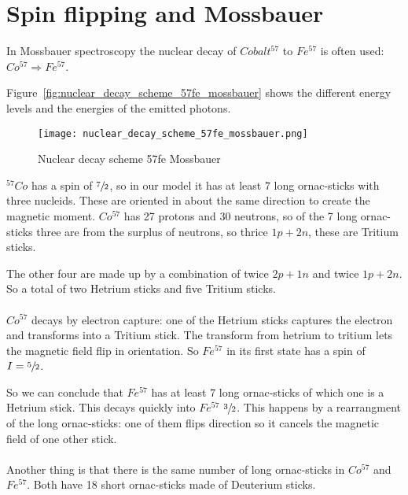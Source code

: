 \section{Spin flipping and Mossbauer}

In Mossbauer spectroscopy the nuclear decay of $Cobalt^{57}$ to $Fe^{57}$ is often used: $Co^{57} \Rightarrow Fe^{57}$.

Figure~\vref{fig:nuclear_decay_scheme_57fe_mossbauer} shows the different energy levels and the energies of the emitted photons.


\begin{figure}[!ht]
    \texttt{[image: nuclear\_decay\_scheme\_57fe\_mossbauer.png]}
    \caption{Nuclear decay scheme 57fe Mossbauer\label{fig:nuclear_decay_scheme_57fe_mossbauer}}
    
\end{figure}

$^{57}Co$ has a spin of $\sfrac{7}{2}$, so in our model it has at least 7 long ornac-sticks with three nucleids. These are oriented in about the same direction to create the magnetic moment.
$Co^{57}$ has 27 protons and 30 neutrons, so of the 7  long ornac-sticks three are from the surplus of neutrons, so thrice $1p+2n$, these are Tritium sticks. 

The other four are made up by a combination of twice $2p+1n$ and twice $1p+2n$. So a total of two Hetrium sticks and five Tritium sticks.

\paragraph{}
$Co^{57}$  decays by electron capture: one of the Hetrium sticks captures the electron and transforms into a Tritium stick. The transform from hetrium to tritium lets the magnetic field flip in orientation. So $Fe^{57}$ in its first state has a spin of $I = \sfrac{5}{2}$.

So we can conclude that $Fe^{57}$ has at least 7 long ornac-sticks of which one is a Hetrium stick.
This decays quickly into $Fe^{57}$ $\sfrac{3}{2}$. This happens by a rearrangment of the long ornac-sticks: one of them flips direction so it cancels the magnetic field of one other stick.

\paragraph{}
Another thing is that there is the same number of long ornac-sticks in $Co^{57}$ and $Fe^{57}$.
Both have 18 short ornac-sticks made of Deuterium sticks. 

